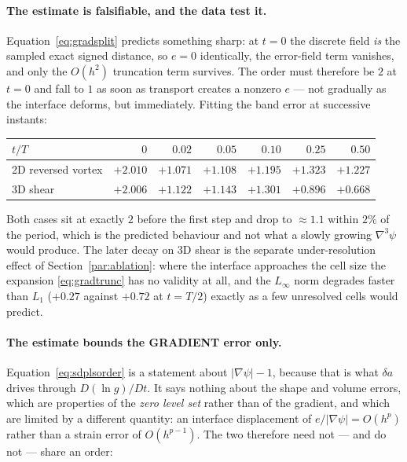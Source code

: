 \documentclass[preprint,3p,11pt]{elsarticle}
\newcommand{\psilev}{\psi}
\newcommand{\gradpsi}{\lvert\nabla\psilev\rvert}
\begin{document}
\paragraph{The estimate is falsifiable, and the data test it.}
Equation~\eqref{eq:gradsplit} predicts something sharp: at $t=0$ the discrete
field \emph{is} the sampled exact signed distance, so $e=0$ identically, the
error-field term vanishes, and only the $O(h^2)$ truncation term survives. The
order must therefore be $2$ at $t=0$ and fall to $1$ as soon as transport
creates a nonzero $e$ --- not gradually as the interface deforms, but
immediately. Fitting the band error at successive instants:

\begin{center}
\begin{tabular}{lrrrrrr}
\toprule
$t/T$ & $0$ & $0.02$ & $0.05$ & $0.10$ & $0.25$ & $0.50$ \\
\midrule
2D reversed vortex & $+2.010$ & $+1.071$ & $+1.108$ & $+1.195$ & $+1.323$ & $+1.227$ \\
3D shear           & $+2.006$ & $+1.122$ & $+1.143$ & $+1.301$ & $+0.896$ & $+0.668$ \\
\bottomrule
\end{tabular}
\end{center}

Both cases sit at exactly $2$ before the first step and drop to $\approx1.1$
within $2\%$ of the period, which is the predicted behaviour and not what a
slowly growing $\nabla^3\psilev$ would produce. The later decay on 3D shear is
the separate under-resolution effect of Section~\ref{par:ablation}: where the
interface approaches the cell size the expansion \eqref{eq:gradtrunc} has no
validity at all, and the $L_\infty$ norm degrades faster than $L_1$
($+0.27$ against $+0.72$ at $t=T/2$) exactly as a few unresolved cells would
predict.

\paragraph{The estimate bounds the GRADIENT error only.}
Equation~\eqref{eq:sdplsorder} is a statement about $\gradpsi-1$, because that
is what $\delta a$ drives through $D(\ln g)/Dt$. It says nothing about the shape
and volume errors, which are properties of the \emph{zero level set} rather than
of the gradient, and which are limited by a different quantity: an interface
displacement of $e/\gradpsi = O(h^p)$ rather than a strain error of
$O(h^{p-1})$. The two therefore need not --- and do not --- share an order:
\end{document}
